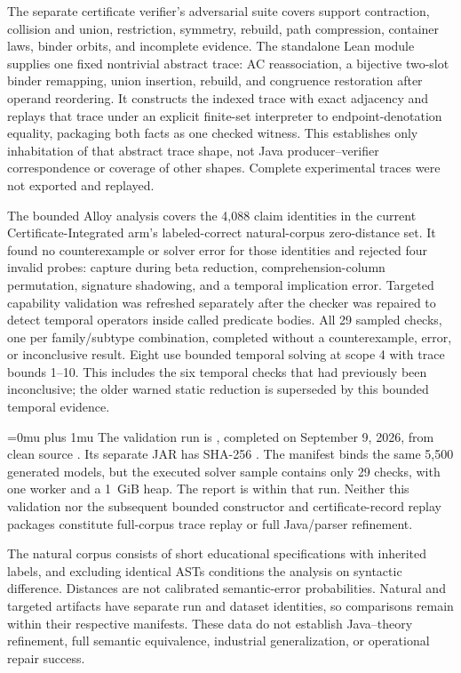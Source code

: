 The separate certificate verifier's adversarial suite covers support
contraction, collision and union, restriction, symmetry, rebuild, path
compression, container laws, binder orbits, and incomplete evidence.  The
standalone Lean module
 supplies one
fixed nontrivial abstract trace: AC reassociation, a bijective two-slot binder
remapping, union insertion, rebuild, and congruence restoration after operand
reordering.  It constructs the indexed trace with exact adjacency and replays
that trace under an explicit finite-set interpreter to endpoint-denotation
equality, packaging both facts as one checked witness.  This establishes
only inhabitation of that abstract trace shape, not Java producer--verifier
correspondence or coverage of other shapes.  Complete experimental traces were
not exported and replayed.

The bounded Alloy analysis covers the 4,088 claim identities in the current
Certificate-Integrated arm's labeled-correct natural-corpus zero-distance set.  It found no
counterexample or solver error for those identities and rejected four invalid
probes: capture during beta
reduction, comprehension-column permutation, signature shadowing, and a
temporal implication error. Targeted capability validation was refreshed
separately after the checker was repaired to detect temporal operators inside
called predicate bodies. All 29 sampled checks, one per family/subtype
combination, completed without a counterexample, error, or inconclusive
result. Eight use bounded temporal solving at scope 4 with trace bounds
1--10. This includes the six temporal checks that had previously been
inconclusive; the older warned static reduction is superseded by this
bounded temporal evidence.

\begingroup
\def\UrlBreaks{\do0\do1\do2\do3\do4\do5\do6\do7\do8\do9%
  \do\a\do\b\do\c\do\d\do\e\do\f}
\Urlmuskip=0mu plus 1mu\relax
The validation run is ,
completed on September 9, 2026, from clean source
. Its separate JAR has
SHA-256 .
The manifest binds the same 5,500 generated models, but the executed solver
sample contains only 29 checks, with one worker and a 1~GiB heap.
The report is  within that run.
Neither this validation nor the subsequent bounded constructor and
certificate-record replay packages constitute full-corpus trace replay or
full Java/parser refinement.
\endgroup

The natural corpus consists of short educational specifications with
inherited labels, and excluding identical ASTs conditions the analysis on
syntactic difference.  Distances are not calibrated semantic-error
probabilities.  Natural and targeted artifacts have separate run and dataset
identities, so comparisons remain within their respective manifests.  These
data do not establish Java--theory refinement, full semantic equivalence,
industrial generalization, or operational repair success.

